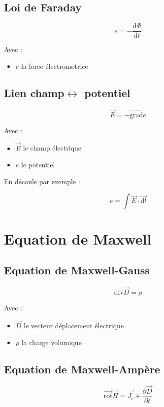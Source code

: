 \documentclass[a4paper, 11pt]{article}
\newcommand{\ve}{\overrightarrow}
\newcommand{\dv}{\mathrm{div}}
\begin{document}
    \subsection{Loi de Faraday}

    $$ e = - \frac{\mathrm{d}\Phi}{\mathrm{d}t}$$

    Avec :
    \begin{itemize}
        \item $e$ la force électromotrice
    \end{itemize}

    \subsection{Lien champ$\leftrightarrow$ potentiel}

    $$\ve{E} = -\ve{\mathrm{grad}}{e}$$

    Avec :
    \begin{itemize}
        \item $\ve{E}$ le champ électrique
        \item $e$ le potentiel
    \end{itemize}

    En découle par exemple :

    $$e = \int \ve{E}\cdot\ve{\mathrm{d}l}$$

    \section{Equation de Maxwell}

    \subsection{Equation de Maxwell-Gauss}

    $$\dv\ve{D} = \rho$$

    Avec :
    \begin{itemize}
        \item $\ve{D}$ le vecteur déplacement électrique
        \item $\rho$ la charge volumique
    \end{itemize}

    \subsection{Equation de Maxwell-Ampère}

    $$\ve{\mathrm{rot}}\ve{H} = \ve{J_c} + \frac{\partial\ve{D}}{\partial t}$$
\end{document}
